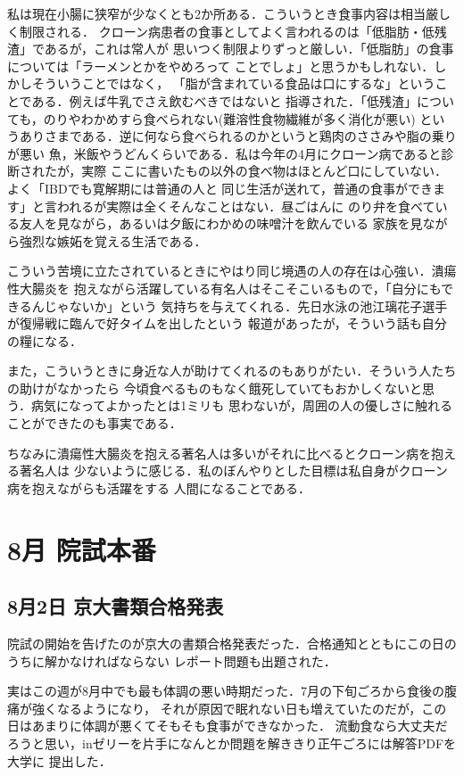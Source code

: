 \documentclass[dvipdfmx,uplatex]{jsarticle}
\begin{document}
私は現在小腸に狭窄が少なくとも2か所ある．こういうとき食事内容は相当厳しく制限される．
クローン病患者の食事としてよく言われるのは「低脂肪・低残渣」であるが，これは常人が
思いつく制限よりずっと厳しい．「低脂肪」の食事については「ラーメンとかをやめろって
ことでしょ」と思うかもしれない．しかしそういうことではなく，
「脂が含まれている食品は口にするな」ということである．例えば牛乳でさえ飲むべきではないと
指導された．「低残渣」についても，のりやわかめすら食べられない(難溶性食物繊維が多く消化が悪い)
というありさまである．逆に何なら食べられるのかというと鶏肉のささみや脂の乗りが悪い
魚，米飯やうどんくらいである．私は今年の4月にクローン病であると診断されたが，実際
ここに書いたもの以外の食べ物はほとんど口にしていない．よく「IBDでも寛解期には普通の人と
同じ生活が送れて，普通の食事ができます」と言われるが実際は全くそんなことはない．昼ごはんに
のり弁を食べている友人を見ながら，あるいは夕飯にわかめの味噌汁を飲んでいる
家族を見ながら強烈な嫉妬を覚える生活である．

こういう苦境に立たされているときにやはり同じ境遇の人の存在は心強い．潰瘍性大腸炎を
抱えながら活躍している有名人はそこそこいるもので，「自分にもできるんじゃないか」という
気持ちを与えてくれる．先日水泳の池江璃花子選手が復帰戦に臨んで好タイムを出したという
報道があったが，そういう話も自分の糧になる．

また，こういうときに身近な人が助けてくれるのもありがたい．そういう人たちの助けがなかったら
今頃食べるものもなく餓死していてもおかしくないと思う．病気になってよかったとは1ミリも
思わないが，周囲の人の優しさに触れることができたのも事実である．

ちなみに潰瘍性大腸炎を抱える著名人は多いがそれに比べるとクローン病を抱える著名人は
少ないように感じる．私のぼんやりとした目標は私自身がクローン病を抱えながらも活躍をする
人間になることである．
\section{8月 院試本番}
\subsection{8月2日 京大書類合格発表}
院試の開始を告げたのが京大の書類合格発表だった．合格通知とともにこの日のうちに解かなければならない
レポート問題も出題された．

実はこの週が8月中でも最も体調の悪い時期だった．7月の下旬ごろから食後の腹痛が強くなるようになり，
それが原因で眠れない日も増えていたのだが，この日はあまりに体調が悪くてそもそも食事ができなかった．
流動食なら大丈夫だろうと思い，inゼリーを片手になんとか問題を解ききり正午ごろには解答PDFを大学に
提出した．
\end{document}
